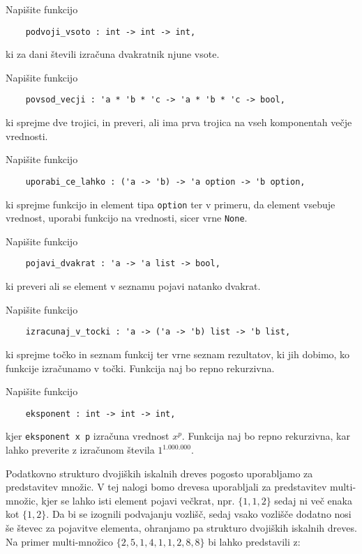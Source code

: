\documentclass[arhiv]{../izpit}
\begin{document}

\naloga[]

\podnaloga
Napišite funkcijo
\begin{verbatim}
    podvoji_vsoto : int -> int -> int,
\end{verbatim}
ki za dani števili izračuna dvakratnik njune vsote.

\podnaloga
Napišite funkcijo
\begin{verbatim}
    povsod_vecji : 'a * 'b * 'c -> 'a * 'b * 'c -> bool,
\end{verbatim}
ki sprejme dve trojici, in preveri, ali ima prva trojica na vseh komponentah večje vrednosti.

\podnaloga
Napišite funkcijo
\begin{verbatim}
    uporabi_ce_lahko : ('a -> 'b) -> 'a option -> 'b option,
\end{verbatim}
ki sprejme funkcijo in element tipa \verb|option| ter v primeru, da element vsebuje vrednost, uporabi funkcijo na vrednosti, sicer vrne \verb|None|.

\podnaloga
Napišite funkcijo
\begin{verbatim}
    pojavi_dvakrat : 'a -> 'a list -> bool,
\end{verbatim}
ki preveri ali se element v seznamu pojavi natanko dvakrat.

\podnaloga
Napišite funkcijo
\begin{verbatim}
    izracunaj_v_tocki : 'a -> ('a -> 'b) list -> 'b list,
\end{verbatim}
ki sprejme točko in seznam funkcij ter vrne seznam rezultatov, ki jih dobimo, ko funkcije izračunamo v točki. Funkcija naj bo repno rekurzivna.

\podnaloga
Napišite funkcijo
\begin{verbatim}
    eksponent : int -> int -> int,
\end{verbatim}
kjer \verb|eksponent x p| izračuna vrednost $x^p$. Funkcija naj bo repno rekurzivna, kar lahko preverite z izračunom števila $1^{1.000.000}$.

\naloga
Podatkovno strukturo dvojiških iskalnih dreves pogosto uporabljamo za predstavitev množic. V tej nalogi bomo drevesa uporabljali za predstavitev multi-množic, kjer se lahko isti element pojavi večkrat, npr. $\{ 1, 1, 2 \}$ sedaj ni več enaka kot $\{ 1, 2 \}$. Da bi se izognili podvajanju vozlišč, sedaj vsako vozlišče dodatno nosi še števec za pojavitve elementa, ohranjamo pa strukturo dvojiških iskalnih dreves. Na primer multi-množico $\{2, 5, 1, 4, 1, 1, 2, 8, 8\}$ bi lahko predstavili z:
\end{document}
